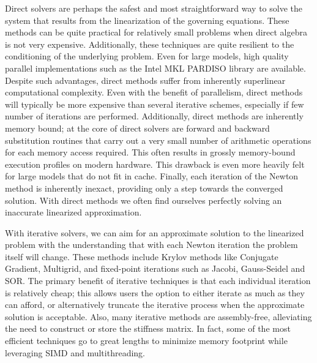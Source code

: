  Direct solvers are perhaps the safest and most straightforward way to
 solve the system that results from the linearization of the governing
 equations. These methods can be quite practical for relatively small
 problems when direct algebra is not very expensive. Additionally,
 these techniques are quite resilient to the conditioning of the
 underlying problem. Even for large models, high quality parallel
 implementations such as the Intel MKL PARDISO library are
 available. Despite such advantages, direct methods suffer from
 inherently superlinear computational complexity. Even with the
 benefit of parallelism, direct methods will typically be more
 expensive than several iterative schemes, especially if few number of
 iterations are performed. Additionally, direct methods are inherently
 memory bound; at the core of direct solvers are forward and backward
 substitution routines that carry out a very small number of
 arithmetic operations for each memory access required. This often
 results in grossly memory-bound execution profiles on modern
 hardware. This drawback is even more heavily felt for large models
 that do not fit in cache. Finally, each iteration of the Newton
 method is inherently inexact, providing only a step towards the
 converged solution. With direct methods we often find ourselves
 perfectly solving an inaccurate linearized approximation.

 With iterative solvers, we can aim for an approximate solution to the
 linearized problem with the understanding that with each Newton
 iteration the problem itself will change. These methods include
 Krylov methods like Conjugate Gradient, Multigrid, and fixed-point
 iterations such as Jacobi, Gauss-Seidel and SOR. The primary benefit
 of iterative techniques is that each individual iteration is
 relatively cheap; this allows users the option to either iterate as
 much as they can afford, or alternatively truncate the iterative
 process when the approximate solution is acceptable.  Also, many
 iterative methods are assembly-free, alleviating the need to
 construct or store the stiffness matrix.  In fact, some of the most
 efficient techniques go to great lengths to minimize memory footprint
 \citep{McAdaZSETTS:2011} while leveraging SIMD and multithreading.


